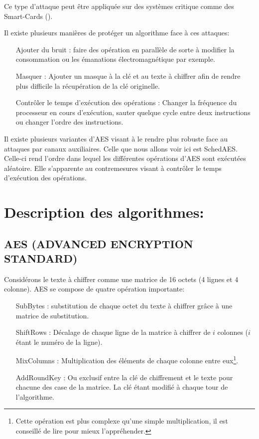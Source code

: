 \documentclass[letterpaper]{article}
\begin{document}
Ce type d'attaque peut être appliquée sur des systèmes critique comme des Smart-Cards (\cite{chari1999cautionary}).

Il existe plusieurs manières de protéger un algorithme face à ces attaques:
\begin{itemize}
    \item[Ajouter du bruit :] faire des opération en parallèle de sorte à modifier la consommation ou les émanations électromagnétique par exemple.
    \item[Masquer :] Ajouter un masque à la clé et au texte à chiffrer afin de rendre plus difficile la récupération de la clé originelle.
    \item[Contrôler le temps d'exécution des opérations :] Changer la fréquence du processeur en cours d'exécution, sauter quelque cycle entre deux instructions ou changer l'ordre des instructions.
\end{itemize}

Il existe plusieurs variantes d'AES visant à le rendre plus robuste face au attaques par canaux auxiliaires.
Celle que nous allons voir ici est SchedAES.
Celle-ci rend l'ordre dans lequel les différentes opérations d'AES sont exécutées aléatoire.
Elle s'apparente au contremesures visant à contrôler le temps d'exécution des opérations.

\section{Description des algorithmes:}
\subsection{AES (ADVANCED ENCRYPTION STANDARD)}
Considérons le texte à chiffrer comme une matrice de 16 octets (4 lignes et 4 colonne).
AES se compose de quatre opération importante:
\begin{itemize}
    \item[SubBytes :] substitution de chaque octet du texte à chiffrer grâce à une matrice de substitution.
    \item[ShiftRows :] Décalage de chaque ligne de la matrice à chiffrer de $i$ colonnes ($i$ étant le numéro de la ligne).
    \item[MixColumns :] Multiplication des éléments de chaque colonne entre eux\footnote{Cette opération est plus complexe qu'une simple multiplication, il est conseillé de lire \cite{fips197} pour mieux l'appréhender.}.
    \item[AddRoundKey :] Ou exclusif entre la clé de chiffrement et le texte pour chacune des case de la matrice. La clé étant modifié à chaque tour de l'algorithme.
\end{itemize}
\end{document}
